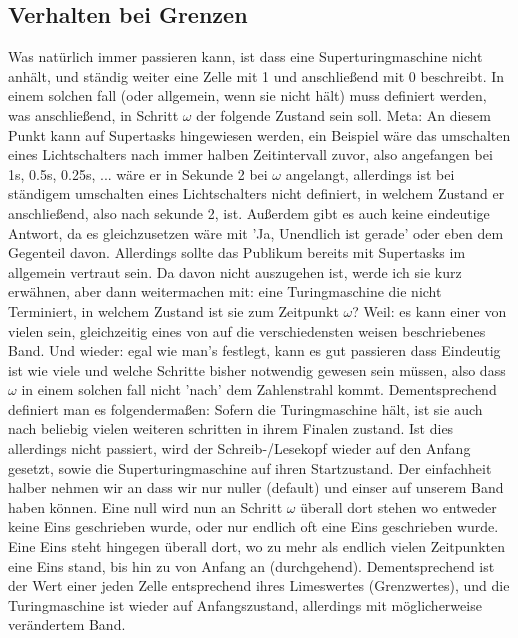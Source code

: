 \documentclass{scrartcl}
\begin{document}
\subsection{Verhalten bei Grenzen}
Was natürlich immer passieren kann, ist dass eine Superturingmaschine nicht
anhält, und ständig weiter eine Zelle mit 1 und anschließend mit 0 beschreibt.
In einem solchen fall (oder allgemein, wenn sie nicht hält) muss definiert
werden, was anschließend, in Schritt $\omega$ der folgende Zustand sein soll. Meta: An
diesem Punkt kann auf Supertasks hingewiesen werden, ein Beispiel wäre das
umschalten eines Lichtschalters nach immer halben Zeitintervall zuvor, also
angefangen bei 1s, 0.5s, 0.25s, ... wäre er in Sekunde 2 bei $\omega$
angelangt, allerdings ist bei ständigem umschalten eines Lichtschalters nicht
definiert, in welchem Zustand er anschließend, also nach sekunde 2, ist.
Außerdem gibt es auch keine eindeutige Antwort, da es gleichzusetzen wäre mit
'Ja, Unendlich ist gerade' oder eben dem Gegenteil davon. Allerdings sollte das
Publikum bereits mit Supertasks im allgemein vertraut sein. Da davon nicht
auszugehen ist, werde ich sie kurz erwähnen, aber dann weitermachen mit: eine
Turingmaschine die nicht Terminiert, in welchem Zustand ist sie zum Zeitpunkt
$\omega$? Weil: es kann einer von vielen sein, gleichzeitig eines von auf die
verschiedensten weisen beschriebenes Band. Und wieder: egal wie man's festlegt,
kann es gut passieren dass Eindeutig ist wie viele und welche Schritte bisher
notwendig gewesen sein müssen, also dass $\omega$ in einem solchen fall nicht
'nach' dem Zahlenstrahl kommt. Dementsprechend definiert man es folgendermaßen:
Sofern die Turingmaschine hält, ist sie auch nach beliebig vielen weiteren
schritten in ihrem Finalen zustand. Ist dies allerdings nicht passiert, wird
der Schreib-/Lesekopf wieder auf den Anfang gesetzt, sowie die
Superturingmaschine auf ihren Startzustand. Der einfachheit halber nehmen wir an dass
wir nur nuller (default) und einser auf unserem Band haben können. Eine null
wird nun an Schritt $\omega$ überall dort stehen wo entweder keine Eins
geschrieben wurde, oder nur endlich oft eine Eins geschrieben wurde. Eine Eins
steht hingegen überall dort, wo zu mehr als endlich vielen Zeitpunkten eine
Eins stand, bis hin zu von Anfang an (durchgehend). Dementsprechend ist der
Wert einer jeden Zelle entsprechend ihres Limeswertes (Grenzwertes), und die
Turingmaschine ist wieder auf Anfangszustand, allerdings mit möglicherweise
verändertem Band.
\end{document}
